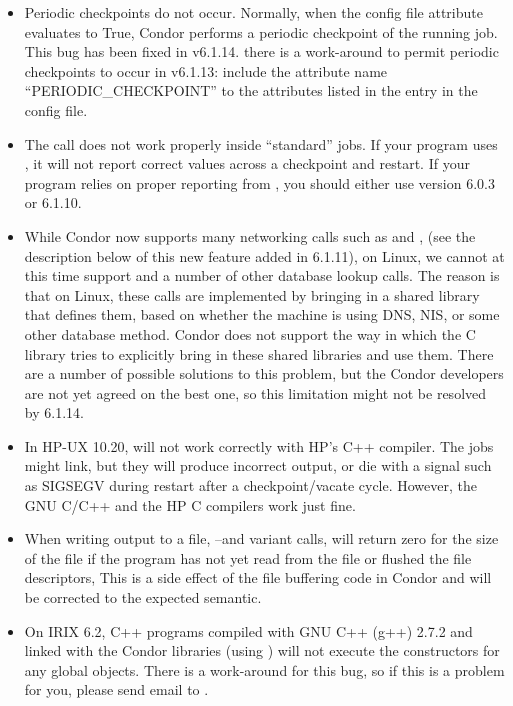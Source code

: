 \begin{itemize}

\item Periodic checkpoints do not occur.  Normally, when the config
file attribute  evaluates to True, 
Condor performs a periodic checkpoint of the running job.  This
bug has been fixed in v6.1.14.  \Note there is a work-around to permit
periodic checkpoints to occur in v6.1.13: include the attribute name
``PERIODIC\_CHECKPOINT'' to the attributes 
listed in the  entry in the config file.

\item The  call does not work properly inside
``standard'' jobs.  
If your program uses , it will not report correct values
across a checkpoint and restart.
If your program relies on proper reporting from , you
should either use version 6.0.3 or 6.1.10.

\item While Condor now supports many networking calls such as
 and , (see the description below of this
new feature added in 6.1.11), on Linux, we cannot at this time support
 and a number of other database lookup calls.
The reason is that on Linux, these calls are implemented by bringing in a
shared library that defines them, based on whether the machine is using
DNS, NIS, or some other database method.
Condor does not support the way in which the C library tries to explicitly
bring in these shared libraries and use them.
There are a number of possible solutions to this problem, but the Condor
developers are not yet agreed on the best one, so this limitation might not
be resolved by 6.1.14.

\item In HP-UX 10.20,  will not work correctly with HP's
C++ compiler. 
The jobs might link, but they will produce incorrect output, or die with
a signal such as SIGSEGV during restart after a checkpoint/vacate cycle.
However, the GNU C/C++ and the HP C compilers work just fine.

\item When writing output to a file, --and variant calls,
will return zero for the size of the file if the program has not yet
read from the file or flushed the file descriptors,
This is a side effect of the file buffering code in Condor and will be
corrected to the expected semantic.

\item On IRIX 6.2, C++ programs compiled with GNU C++ (g++) 2.7.2 and
linked with the Condor libraries (using ) will not
execute the constructors for any global objects.
There is a work-around for this bug, so if this is a problem for you,
please send email to .

\end{itemize}

